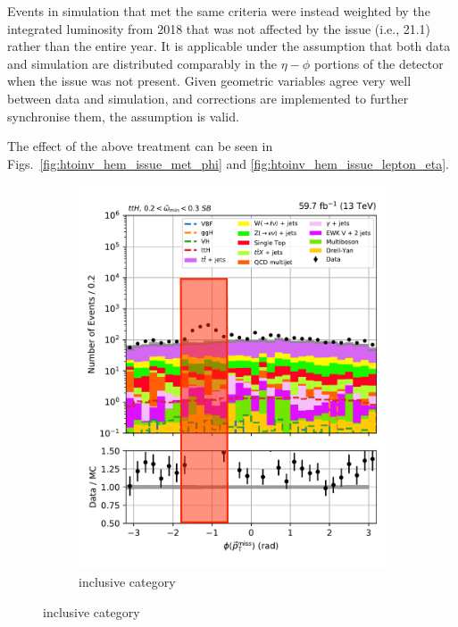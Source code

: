 \medskip

\noindent{}Events in simulation that met the same criteria were instead weighted by the integrated luminosity from 2018 that was not affected by the issue (i.e., 21.1\fbinv) rather than the entire year. It is applicable under the assumption that both data and simulation are distributed comparably in the $\eta-\phi$ portions of the detector when the issue was not present. Given geometric variables agree very well between data and simulation, and corrections are implemented to further synchronise them, the assumption is valid.

The effect of the above treatment can be seen in Figs.~\ref{fig:htoinv_hem_issue_met_phi} and \ref{fig:htoinv_hem_issue_lepton_eta}.

\begin{figure}[htbp]
    \centering
    \begin{subfigure}[b]{0.34\textwidth}
        \includegraphics[width=\textwidth]{figures/hem_issue/sideband_4/met_phi/met_phi_ttH_before_annotated.pdf}
        \caption{\ttH inclusive category}

\end{subfigure}
\end{figure}
